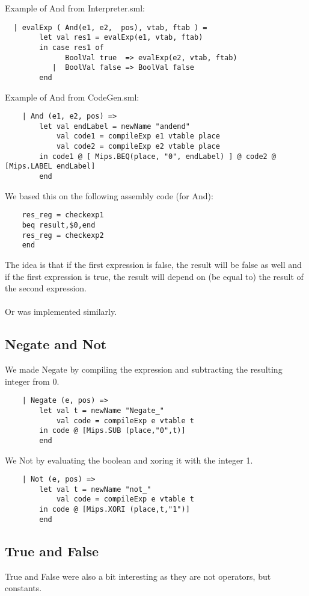 \documentclass{article}
\begin{document}
\noindent Example of And from Interpreter.sml:
\begin{verbatim}
  | evalExp ( And(e1, e2,  pos), vtab, ftab ) =
        let val res1 = evalExp(e1, vtab, ftab)
        in case res1 of
              BoolVal true  => evalExp(e2, vtab, ftab)
           |  BoolVal false => BoolVal false
        end
\end{verbatim}

\noindent Example of And from CodeGen.sml:
\begin{verbatim}
    | And (e1, e2, pos) =>
        let val endLabel = newName "andend"
            val code1 = compileExp e1 vtable place
            val code2 = compileExp e2 vtable place
        in code1 @ [ Mips.BEQ(place, "0", endLabel) ] @ code2 @ [Mips.LABEL endLabel]
        end
\end{verbatim}

\noindent We based this on the following assembly code (for And):
\begin{verbatim}
    res_reg = checkexp1
    beq result,$0,end
    res_reg = checkexp2
    end
\end{verbatim}
The idea is that if the first expression is false, the result will be false as well and if the first expression is true, the result will depend on (be equal to) the result of the second expression.\\
\\
Or was implemented similarly.
\subsection{Negate and Not}
We made Negate by compiling the expression and subtracting the resulting integer from 0.
\begin{verbatim}
    | Negate (e, pos) =>
        let val t = newName "Negate_"
            val code = compileExp e vtable t
        in code @ [Mips.SUB (place,"0",t)]
        end
\end{verbatim}
We Not by evaluating the boolean and xoring it with the integer 1.
\begin{verbatim}
    | Not (e, pos) =>
        let val t = newName "not_"
            val code = compileExp e vtable t
        in code @ [Mips.XORI (place,t,"1")]
        end
\end{verbatim}

\subsection{True and False}
True and False were also a bit interesting as they are not operators, but constants.
\end{document}
